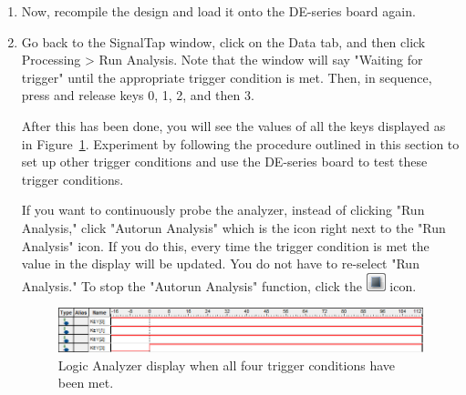 \documentclass[11pt, twoside, pdftex]{article}
\begin{document}
\begin{enumerate}
\item Now, recompile the design and load it onto the DE-series board again.
  
\item Go back to the SignalTap window, click on the Data tab, and then click {\sf Processing > Run Analysis}. Note that the window
will say "Waiting for trigger" until the appropriate trigger condition is met. Then, in sequence, press and release keys 0, 1, 2, and then 3.

After this has been done, you will see the values of all the keys displayed as in Figure~\ref{fig:16}. Experiment by following
the procedure outlined in this section to set up other trigger conditions and use the DE-series board to test these trigger
conditions.

If you want to continuously probe the analyzer, instead of clicking "Run Analysis,"  click "Autorun Analysis" which
is the icon right next to the "Run Analysis" icon. If you do this, every time the trigger condition is met the value in the
display will be updated. You do not have to re-select "Run Analysis." To stop the "Autorun Analysis" function, click the \includegraphics[scale=0.7]{figures/icon2.png} icon.
  
\begin{figure}[H]
   \begin{center}
      \includegraphics[scale=0.65]{figures/figure16.png}
   \caption{Logic Analyzer display when all four trigger conditions have been met.} 
	 \label{fig:16}
	 \end{center}
\end{figure}

\end{enumerate}
\end{document}
